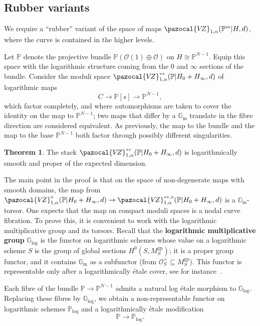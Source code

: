 \documentclass[11pt]{amsart}
\newcommand{\VZ}{\pazocal{V\!Z}}
\newcommand{\OO}{\mathcal{O}}
\renewcommand{\to}{\rightarrow}
\newcommand{\Gm}{\mathbb{G}_{\text{m}}}
\theoremstyle{definition}
\newtheorem{thm}{Theorem}[section]
\theoremstyle{definition}
\begin{document}
\subsection{Rubber variants}\label{subsection rubber} We require a ``rubber'' variant of the space of maps $\VZ_{1,\alpha}(\mathbb P^m|H,d)$, where the curve is contained in the higher levels.

Let $\mathbb P$ denote the projective bundle $\mathbb P(\mathcal O(1)\oplus\mathcal O)$ on $H\cong\mathbb P^{N-1}$. Equip this space with the logarithmic structure coming from the $0$ and $\infty$ sections of the bundle. Consider the moduli space $\VZ^{\leftrightarrow}_{1,\alpha}(\mathbb P|H_0+H_\infty,d)$ of logarithmic maps
\[
C\to \mathbb P[s]\to \mathbb P^{N-1},
\]
which factor completely, and where automorphisms are taken to cover the identity on the map to $\mathbb P^{N-1}$; two maps that differ by a $\mathbb G_{\operatorname{m}}$ translate in the fibre direction are considered equivalent. As previously, the map to the bundle and the map to the base $\mathbb P^{N-1}$ both factor through possibly different singularities. 

\begin{thm}\label{thm rubber log smooth}
The stack $\VZ^{\leftrightarrow}_{1,\alpha}(\mathbb P|H_0+H_\infty,d)$ is logarithmically smooth and proper of the expected dimension.
\end{thm}

The main point in the proof is that on the space of non-degenerate maps with smooth domains, the map from $\VZ^\circ_{1,\alpha}(\mathbb P|H_0+H_\infty,d)\to \VZ^{\leftrightarrow,\circ}_{1,\alpha}(\mathbb P|H_0+H_\infty,d)$ is a $\mathbb G_{\operatorname{m}}$-torsor. One expects that the map on compact moduli spaces is a nodal curve fibration. To prove this, it is convenient to work with the logarithmic multiplicative group and its torsors. Recall that the \textbf{logarithmic multiplicative group} $\mathbb G_{\mathrm{log}}$ is the functor on logarithmic schemes whose value on a logarithmic scheme $S$ is the group of global sections $H^0(S,M_S^{\mathrm{gp}})$; it is a proper group functor, and it contains $\Gm$ as a subfunctor (from $\OO^\times_S\subseteq M_S^{\mathrm{gp}}$). This functor is representable only after a logarithmically \'etale cover, see for instance~\cite{MW17,RW19}.

Each fibre of the bundle $\mathbb P \to \mathbb P^{N-1}$ admits a natural log \'etale morphism to $\mathbb G_{\mathrm{log}}$. Replacing these fibres by $\mathbb G_{\mathrm{log}}$, we obtain a non-representable functor on logarithmic schemes $\mathbb P_{\mathrm{log}}$ and a logarithmically \'etale modification
\[
\mathbb P\to \mathbb P_{\mathrm{log}}.
\]
\end{document}
